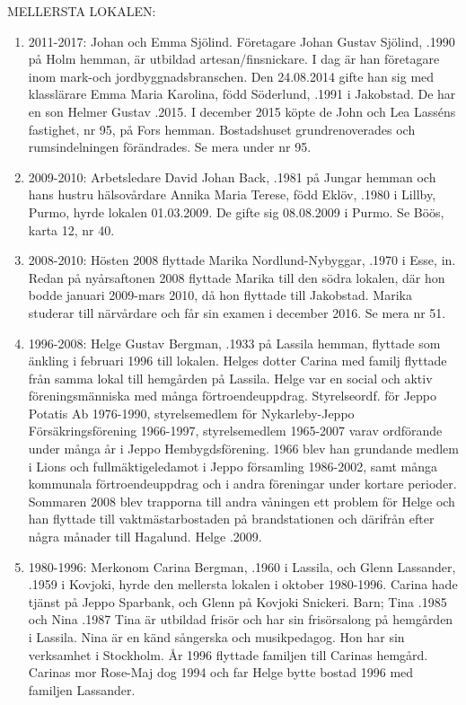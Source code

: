 MELLERSTA LOKALEN:
\begin{enumerate}
  \item 2011-2017: Johan och Emma Sjölind. Företagare Johan Gustav Sjölind, .1990 på Holm hemman, är utbildad 	artesan/finsnickare. I dag är han företagare inom mark-och jordbyggnadsbranschen. Den 24.08.2014 gifte han sig med klasslärare Emma Maria Karolina, född Söderlund, .1991 i Jakobstad. De har	en son Helmer Gustav .2015. I december 2015 köpte de John och Lea Lasséns fastighet, nr 95, på Fors hemman. Bostadshuset 	grundrenoverades och rumsindelningen förändrades. Se mera under nr 95.
  \item 2009-2010: Arbetsledare David Johan Back, .1981 på Jungar hemman och hans hustru hälsovårdare Annika Maria Terese, född Eklöv, .1980 i Lillby, Purmo, hyrde lokalen 01.03.2009. De gifte sig 08.08.2009 i Purmo. Se Böös, karta 12, nr 40.
  \item 2008-2010: 	Hösten 2008 flyttade Marika Nordlund-Nybyggar, .1970 i Esse, in. Redan på nyårsaftonen 2008 flyttade Marika till den södra lokalen, där hon bodde januari 2009-mars 2010, då hon flyttade till Jakobstad. Marika studerar till närvårdare och får sin examen i december 2016. Se mera nr 51.
  \item 1996-2008: 	Helge Gustav Bergman, .1933 på Lassila hemman, flyttade som änkling i februari 1996 till lokalen. Helges dotter Carina med familj flyttade från samma lokal till hemgården på Lassila. Helge var en social och aktiv föreningsmänniska med många förtroendeuppdrag. Styrelseordf. för Jeppo Potatis Ab 1976-1990, styrelsemedlem för Nykarleby-Jeppo Försäkringsförening 1966-1997, styrelsemedlem 1965-2007 varav ordförande under många år i Jeppo Hembygdsförening. 1966 blev han grundande medlem i Lions och fullmäktigeledamot i Jeppo församling 1986-2002, samt många kommunala förtroendeuppdrag och i andra föreningar under kortare perioder. Sommaren 2008 blev trapporna till andra våningen ett problem för Helge och han flyttade till vaktmästarbostaden på brandstationen och därifrån efter några månader till Hagalund. Helge .2009.
  \item 1980-1996: Merkonom Carina Bergman, .1960 i Lassila, och Glenn Lassander, .1959 i Kovjoki, hyrde den mellersta lokalen i oktober 1980-1996. Carina hade tjänst på Jeppo Sparbank, och Glenn på Kovjoki Snickeri.
  Barn;	Tina .1985 och	Nina .1987
  Tina är utbildad frisör och har sin frisörsalong på hemgården i Lassila. Nina är en känd sångerska och musikpedagog. Hon har sin verksamhet i Stockholm. År 1996 flyttade familjen till Carinas hemgård. Carinas mor Rose-Maj dog 1994 och far Helge bytte bostad 1996 med familjen Lassander.

\end{enumerate}
